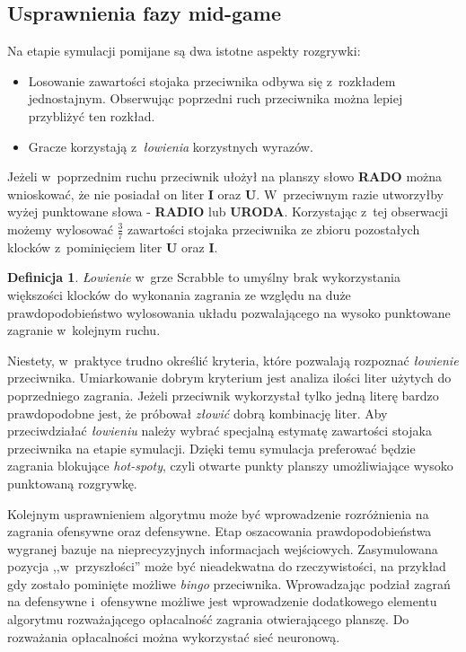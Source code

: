 \documentclass[a4paper,twocolumn,12pt]{article}
\theoremstyle{definition}
\newtheorem{definition}{Definicja}
\begin{document}
\subsection*{Usprawnienia fazy mid-game}

Na etapie symulacji pomijane są dwa istotne aspekty rozgrywki:

\begin{itemize}
	\item Losowanie zawartości stojaka przeciwnika odbywa się z~rozkładem jednostajnym. Obserwując poprzedni ruch przeciwnika można lepiej przybliżyć ten rozkład.
	\item Gracze korzystają z~\emph{łowienia} korzystnych wyrazów.
\end{itemize}

Jeżeli w~poprzednim ruchu przeciwnik ułożył na planszy słowo \textbf{RADO} można wnioskować, że nie posiadał on liter \textbf{I} oraz \textbf{U}. W~przeciwnym razie utworzyłby wyżej punktowane słowa - \textbf{RADIO} lub \textbf{URODA}. Korzystając z~tej obserwacji możemy wylosować $\frac{3}{7}$ zawartości stojaka przeciwnika ze zbioru pozostałych klocków z~pominięciem liter \textbf{U} oraz \textbf{I}. 

\begin{definition}
	\emph{Łowienie} w~grze Scrabble to umyślny brak wykorzystania większości klocków do wykonania zagrania ze względu na duże prawdopodobieństwo wylosowania układu pozwalającego na wysoko punktowane zagranie w~kolejnym ruchu.
\end{definition}

Niestety, w~praktyce trudno określić kryteria, które pozwalają rozpoznać \emph{łowienie} przeciwnika. Umiarkowanie dobrym kryterium jest analiza ilości liter użytych do poprzedniego zagrania. Jeżeli przeciwnik wykorzystał tylko jedną literę bardzo prawdopodobne jest, że próbował \emph{złowić} dobrą kombinację liter. Aby przeciwdziałać \emph{łowieniu} należy wybrać specjalną estymatę zawartości stojaka przeciwnika na etapie symulacji. Dzięki temu symulacja preferować będzie zagrania blokujące \emph{hot-spoty}, czyli otwarte punkty planszy umożliwiające wysoko punktowaną rozgrywkę.

Kolejnym usprawnieniem algorytmu może być wprowadzenie rozróżnienia na zagrania ofensywne oraz defensywne. Etap oszacowania prawdopodobieństwa wygranej bazuje na nieprecyzyjnych informacjach wejściowych. Zasymulowana pozycja ,,w~przyszłości'' może być nieadekwatna do rzeczywistości, na przykład gdy zostało pominięte możliwe \emph{bingo} przeciwnika. Wprowadzając podział zagrań na defensywne i~ofensywne możliwe jest wprowadzenie dodatkowego elementu algorytmu rozważającego opłacalność zagrania otwierającego planszę. Do rozważania opłacalności można wykorzystać sieć neuronową.
\end{document}
